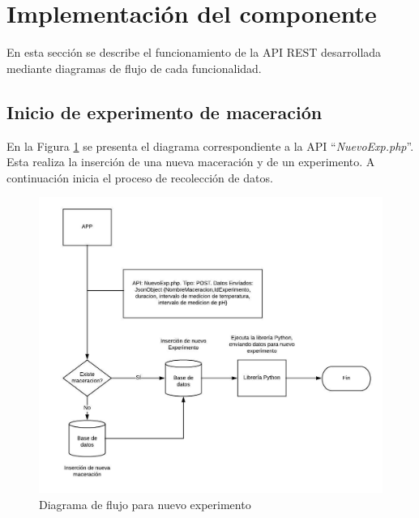     \section{Implementación del componente}
        \par En esta sección se describe el funcionamiento de la API REST desarrollada mediante diagramas de flujo de cada funcionalidad.
        
        \subsection{Inicio de experimento de maceración}
        \par En la Figura \ref{fig:ApiNuevoExp} se presenta el diagrama correspondiente a la API ``\textit{NuevoExp.php}''. Esta realiza la inserción de una nueva maceración y de un experimento. A continuación inicia el proceso de recolección de datos.
            \begin{figure} [h]
                \centering
                \includegraphics[scale=0.85]{DiagramaNuevoExp.jpeg}
                \caption{Diagrama de flujo para nuevo experimento}
                \label{fig:ApiNuevoExp}
            \end{figure}
            
